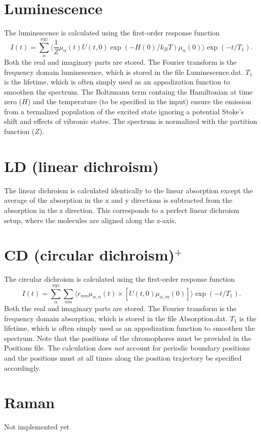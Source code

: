 \section{Luminescence}
The luminescence is calculated using the first-order response function
\begin{equation}
	I(t)=\sum_{\alpha}^{xyz}\langle\frac{1}{Z}\mu_{\alpha}(t)U(t,0)\exp(-H(0)/k_BT)\mu_{\alpha}(0)\rangle\exp(-t/T_1).
\end{equation}
Both the real and imaginary parts are stored. The Fourier transform is the frequency domain luminescence, which is stored in the file Luminescence.dat. $T_1$ is the lifetime, which is often simply used as an appodization function to smoothen the spectrum. The Boltzmann term containg the Hamiltonian at time zero ($H$) and the temperature (to be specified in the input) ensure the emission from a termalized population of the excited state ignoring a potential Stoke's shift and effects of vibronic states. The spectrum is normalized with the partition function ($Z$). 
\section{LD (linear dichroism)}
The linear dichroism is calculated identically to the linear absorption except the average of the absorption in the x and y directions is subtracted from the absorption in the z direction. This corresponds to a perfect linear dichroism setup, where the molecules are aligned along the z-axis.
\section{CD (circular dichroism)$^{+}$}
The circular dichroism is calculated using the first-order response function
\begin{equation}
	I(t)=\sum_{\alpha}^{xyz}\sum_{nm}\langle r_{nm}\mu_{\alpha,n}(t)\times[U(t,0)\mu_{\alpha,m}(0)]\rangle\exp(-t/T_1).
\end{equation}
Both the real and imaginary parts are stored. The Fourier transform is the frequency domain absorption, which is stored in the file Absorption.dat. $T_1$ is the lifetime, which is often simply used as an appodization function to smoothen the spectrum. Note that the positions of the chromophores must be provided in the Positions file. The calculation does \textit{not} account for periodic boundary positions and the positions must at all times along the position trajectory be specified accordingly.
\section{Raman}
Not implemented yet
